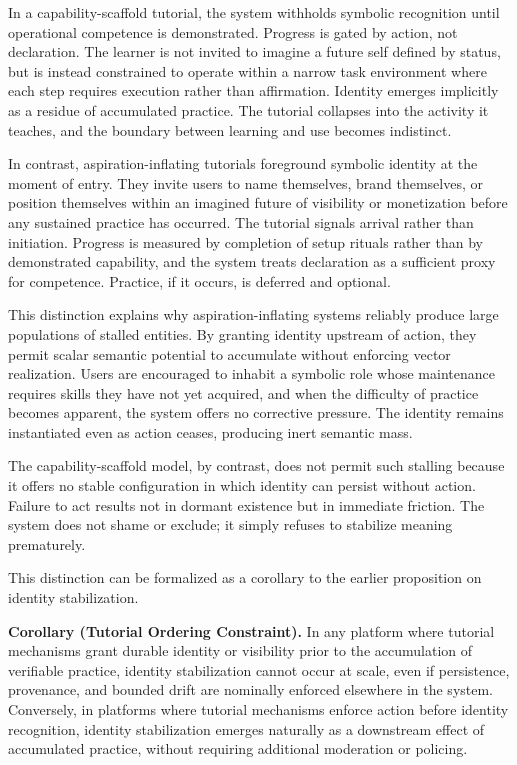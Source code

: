 \documentclass[11pt,oneside]{article}
\begin{document}
In a capability-scaffold tutorial, the system withholds symbolic recognition until operational competence is demonstrated. Progress is gated by action, not declaration. The learner is not invited to imagine a future self defined by status, but is instead constrained to operate within a narrow task environment where each step requires execution rather than affirmation. Identity emerges implicitly as a residue of accumulated practice. The tutorial collapses into the activity it teaches, and the boundary between learning and use becomes indistinct.

In contrast, aspiration-inflating tutorials foreground symbolic identity at the moment of entry. They invite users to name themselves, brand themselves, or position themselves within an imagined future of visibility or monetization before any sustained practice has occurred. The tutorial signals arrival rather than initiation. Progress is measured by completion of setup rituals rather than by demonstrated capability, and the system treats declaration as a sufficient proxy for competence. Practice, if it occurs, is deferred and optional.

This distinction explains why aspiration-inflating systems reliably produce large populations of stalled entities. By granting identity upstream of action, they permit scalar semantic potential to accumulate without enforcing vector realization. Users are encouraged to inhabit a symbolic role whose maintenance requires skills they have not yet acquired, and when the difficulty of practice becomes apparent, the system offers no corrective pressure. The identity remains instantiated even as action ceases, producing inert semantic mass.

The capability-scaffold model, by contrast, does not permit such stalling because it offers no stable configuration in which identity can persist without action. Failure to act results not in dormant existence but in immediate friction. The system does not shame or exclude; it simply refuses to stabilize meaning prematurely.

This distinction can be formalized as a corollary to the earlier proposition on identity stabilization.

\textbf{Corollary (Tutorial Ordering Constraint).} In any platform where tutorial mechanisms grant durable identity or visibility prior to the accumulation of verifiable practice, identity stabilization cannot occur at scale, even if persistence, provenance, and bounded drift are nominally enforced elsewhere in the system. Conversely, in platforms where tutorial mechanisms enforce action before identity recognition, identity stabilization emerges naturally as a downstream effect of accumulated practice, without requiring additional moderation or policing.
\end{document}
